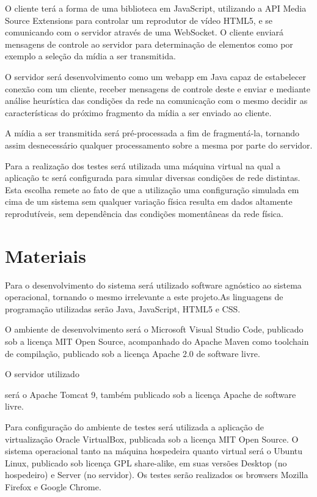 \documentclass[a4paper,12pt]{article}
\begin{document}
O cliente terá a forma de uma biblioteca em JavaScript, utilizando a API Media Source Extensions para controlar um reprodutor de vídeo HTML5, e se comunicando com o servidor através de uma WebSocket. O cliente enviará mensagens de controle ao servidor para determinação de elementos como por exemplo a seleção da mídia a ser transmitida.

O servidor será desenvolvimento como um webapp em Java capaz de estabelecer conexão com um cliente, receber mensagens de controle deste e enviar e mediante análise heurística das condições da rede na comunicação com o mesmo decidir as características do próximo fragmento da mídia a ser enviado ao cliente.

A mídia a ser transmitida será pré-processada a fim de fragmentá-la, tornando assim desnecessário qualquer processamento sobre a mesma por parte do servidor.

Para a realização dos testes será utilizada uma máquina virtual na qual a aplicação tc será configurada para simular diversas condições de rede distintas. Esta escolha remete ao fato de que a utilização uma configuração simulada em cima de um sistema sem qualquer variação física resulta em dados altamente reprodutíveis, sem dependência das condições momentâneas da rede física.

\section{Materiais}

Para o desenvolvimento do sistema será utilizado software agnóstico ao sistema operacional, tornando o mesmo irrelevante a este projeto.As linguagens de programação utilizadas serão Java, JavaScript, HTML5 e CSS.

O ambiente de desenvolvimento será o Microsoft Visual Studio Code, publicado sob a licença MIT Open Source, acompanhado do Apache Maven como toolchain de compilação, publicado sob a licença Apache 2.0 de software livre.

O servidor utilizado

será o Apache Tomcat 9, também publicado sob a licença Apache de software livre.

Para configuração do ambiente de testes será utilizada a aplicação de virtualização Oracle VirtualBox, publicada sob a licença MIT Open Source. O sistema operacional tanto na máquina hospedeira quanto virtual será o Ubuntu Linux, publicado sob licença GPL share-alike, em suas versões Desktop (no hospedeiro) e Server (no servidor). Os testes serão realizados os browsers Mozilla Firefox e Google Chrome.
\end{document}
